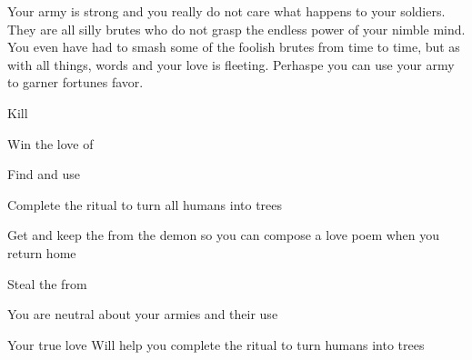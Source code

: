 \documentclass[char]{guildcamp2}
\begin{document}
Your army is strong and you really do not care what happens to your soldiers. They are all silly brutes who do not grasp the endless power of your nimble mind. You even have had to smash some of the foolish brutes from time to time, but as with all things, words and your love is fleeting. Perhaspe you can use your army to garner fortunes favor.  

\begin{itemz}[Goals]
  \item Kill \cWizard{}
  \item Win the love of \cTreeFae{}
  \item Find and use \iLovePotion{}
	\item Complete the ritual to turn all humans into trees
	\item Get and keep the \iQuill{} from the demon so you can compose a love poem when you return home
	\item Steal the \iTearofMagic{} from \cBabyFae{}
\end{itemz}

\begin{itemz}[Notes]
  \item You are neutral about your armies and their use
\end{itemz}


\begin{contacts}
  \contact{\cTreeFae{}} Your true love
  \contact{\cEnt{}} Will help you complete the ritual to turn humans into trees
\end{contacts}
\end{document}
